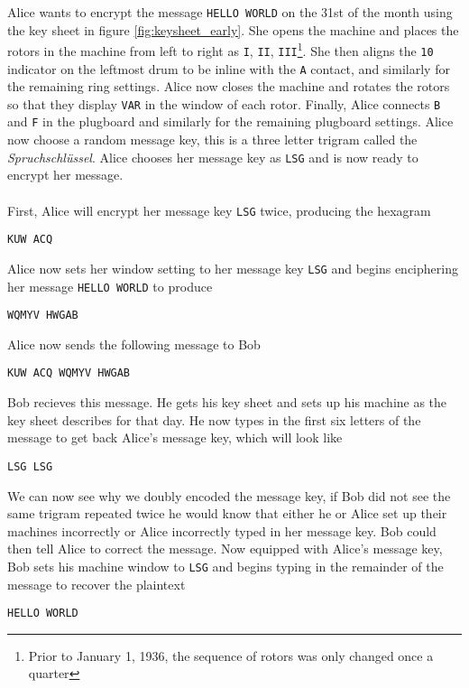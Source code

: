 \noindent Alice wants to encrypt the message \texttt{HELLO WORLD} on
the 31st of the month using the key sheet in figure
\ref{fig:keysheet_early}. She opens the machine and places the rotors in
the machine from left to right as \texttt{I}, \texttt{II},
\texttt{III}\footnote{Prior to January 1, 1936, the sequence of
rotors was only changed once a quarter}. She then aligns the
\texttt{10} indicator on the
leftmost drum to be inline with the \texttt{A} contact, and similarly
for the remaining ring settings. Alice now closes the machine and
rotates the rotors so that they display \texttt{VAR} in the window of
each rotor. Finally, Alice connects \texttt{B} and \texttt{F} in the
plugboard and similarly for the remaining plugboard settings. Alice
now choose a random message key, this is a three letter trigram
called the \emph{Spruchschlüssel}. Alice chooses her message key as
\texttt{LSG} and is now ready to encrypt her message.
\\\\First, Alice will encrypt her message key \texttt{LSG} twice,
producing the hexagram
\begin{center}
  \texttt{KUW ACQ}
\end{center}
\noindent Alice now sets her window setting to her message key
\texttt{LSG} and begins enciphering her message \texttt{HELLO WORLD} to produce
\begin{center}
  \texttt{WQMYV HWGAB}
\end{center}
Alice now sends the following message to Bob
\begin{center}
  \texttt{KUW ACQ WQMYV HWGAB}
\end{center}
\noindent Bob recieves this message. He gets his key sheet and sets
up his machine as the key sheet describes for that day. He now types
in the first six letters of the message to get back Alice's message
key, which will look like
\begin{center}
  \texttt{LSG LSG}
\end{center}
We can now see why we doubly encoded the message key, if Bob did not
see the same trigram repeated twice he would know that either he or
Alice set up their machines incorrectly or Alice incorrectly typed in
her message key. Bob could then tell Alice to correct the message.
Now equipped with Alice's message key, Bob sets his machine window to
\texttt{LSG} and begins typing in the remainder of the message to
recover the plaintext
\begin{center}
  \texttt{HELLO WORLD}
\end{center}
